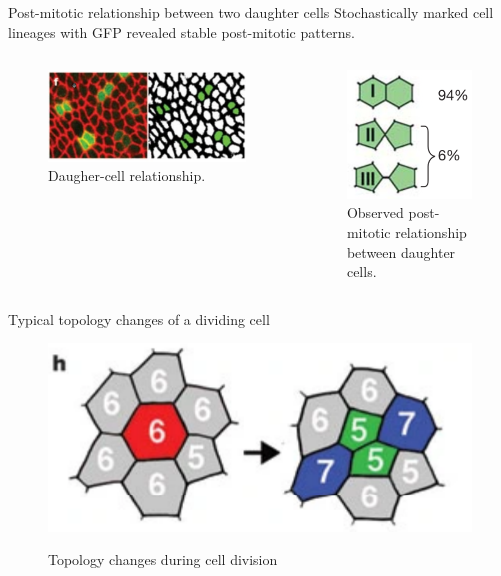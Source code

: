 \documentclass[aspectratio=169, 10pt]{beamer}
\begin{document}
\begin{frame}[fragile]{Post-mitotic relationship between two daughter cells}
  Stochastically marked cell lineages with GFP revealed stable post-mitotic patterns.     
  \begin{columns}[]
    \begin{figure}[b]
      \centering
      \includegraphics[width=\textwidth]{figures/daughter-cell-relationship.png}
      \caption{Daugher-cell relationship.}
      \label{}
    \end{figure}
        \begin{figure}[b]
            \centering
            \includegraphics[width=.4\textwidth]{figures/post-mitotic-relationship.png}
            \caption{Observed post-mitotic relationship between daughter cells.}
            \label{}
    \end{figure}
  \end{columns}  
\end{frame}

\begin{frame}[fragile]{Typical topology changes of a dividing cell}
  \begin{figure}[]
    \centering
    \caption{Topology changes during cell division}
    \includegraphics[width=.5\textwidth]{figures/topology_evolution.png} 
    \label{}
  \end{figure}
\end{frame}
\end{document}
